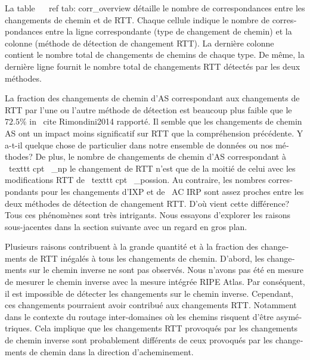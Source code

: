 \begin{otherlanguage}{french}
{{La table ~ \ ref {tab: corr_overview} détaille le nombre de correspondances entre les changements de chemin et de RTT.
Chaque cellule indique le nombre de correspondances entre la ligne correspondante (type de changement de chemin) et la colonne (méthode de détection de changement RTT).
La dernière colonne contient le nombre total de changements de chemins de chaque type.
De même, la dernière ligne fournit le nombre total de changements RTT détectés par les deux méthodes.

La fraction des changements de chemin d'AS correspondant aux changements de RTT par l'une ou l'autre méthode de détection est beaucoup plus faible que le $ 72.5 \% $ in \ cite {Rimondini2014} rapporté.
Il semble que les changements de chemin AS ont un impact moins significatif sur RTT que la compréhension précédente.
Y a-t-il quelque chose de particulier dans notre ensemble de données ou nos méthodes?
De plus, le nombre de changements de chemin d'AS correspondant à \ texttt {cpt \ _np} le changement de RTT n'est que de la moitié de celui avec les modifications RTT de \ texttt {cpt \ _possion}.
Au contraire, les nombres correspondants pour les changements d'IXP et de \ AC {IRP} sont assez proches entre les deux méthodes de détection de changement RTT.
D'où vient cette différence?
Tous ces phénomènes sont très intrigants.
Nous essayons d'explorer les raisons sous-jacentes dans la section suivante avec un regard en gros plan.

Plusieurs raisons contribuent à la grande quantité et à la fraction des changements de RTT inégalés à tous les changements de chemin.
D'abord, les changements sur le chemin inverse ne sont pas observés.
Nous n'avons pas été en mesure de mesurer le chemin inverse avec la mesure intégrée RIPE Atlas.
Par conséquent, il est impossible de détecter les changements sur le chemin inverse.
Cependant, ces changements pourraient avoir contribué aux changements RTT.
Notamment dans le contexte du routage inter-domaines où les chemins risquent d'être asymétriques.
Cela implique que les changements RTT provoqués par les changements de chemin inverse sont probablement différents de ceux provoqués par les changements de chemin dans la direction d'acheminement.

}}
\end{otherlanguage}

